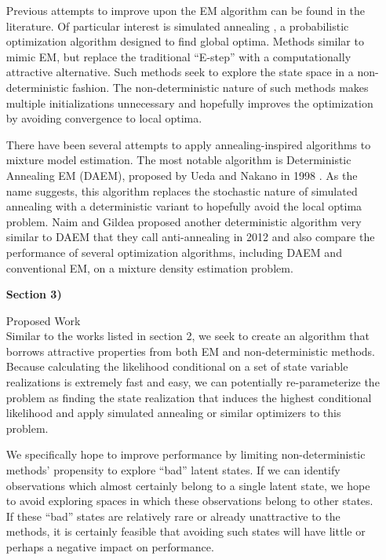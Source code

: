 \documentclass{article}
\theoremstyle{definition}
\begin{document}
\begin{itemize}
{  Previous attempts to improve upon the EM algorithm can be found in the literature. Of particular interest is simulated annealing \cite{kirkpatrickgelattvecchi83}, a probabilistic optimization algorithm designed to find global optima. Methods similar to \cite{kirkpatrickgelattvecchi83} mimic EM, but replace the traditional ``E-step'' with a computationally attractive alternative. Such methods seek to explore the state space in a non-deterministic fashion. The non-deterministic nature of such methods makes multiple initializations unnecessary and hopefully improves the optimization by avoiding convergence to local optima.

  There have been several attempts to apply annealing-inspired algorithms to mixture model estimation. The most notable algorithm is Deterministic Annealing EM (DAEM), proposed by Ueda and Nakano in 1998 \cite{uedanakano98}. As the name suggests, this algorithm replaces the stochastic nature of simulated annealing with a deterministic variant to hopefully avoid the local optima problem. Naim and Gildea proposed another deterministic algorithm very similar to DAEM that they call anti-annealing in 2012 \cite{naimgildea12} and also compare the performance of several optimization algorithms, including DAEM and conventional EM, on a mixture density estimation problem.

  }

\vspace{1cm}

  \item[\textbf{Section 3)}] {Proposed Work\\


  Similar to the works listed in section 2, we seek to create an algorithm that borrows attractive properties from both EM and non-deterministic methods. 
  Because calculating the likelihood conditional on a set of state variable realizations is extremely fast and easy, we can potentially re-parameterize the problem as finding the state realization that induces the highest conditional likelihood and apply simulated annealing or similar optimizers to this problem.

  We specifically hope to improve performance by limiting non-deterministic methods' propensity to explore ``bad'' latent states. If we can identify observations which almost certainly belong to a single latent state, we hope to avoid exploring spaces in which these observations belong to other states. If these ``bad'' states are relatively rare or already unattractive to the methods, it is certainly feasible that avoiding such states will have little or perhaps a negative impact on performance.

}
\end{itemize}
\end{document}
